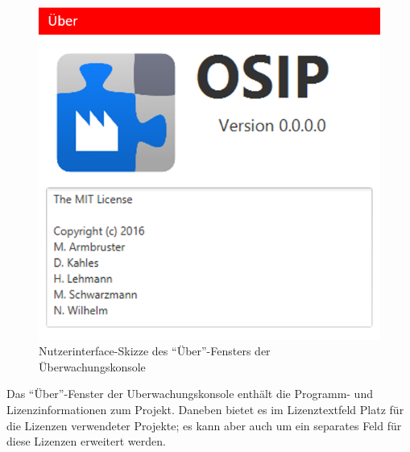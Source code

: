 \documentclass[parskip=full]{scrartcl}
\begin{document}
\begin{figure}[h!]
	\centering
	\includegraphics[scale=0.5]{media/ui-client/ui-uw-uber.png}
	\caption{Nutzerinterface-Skizze des "`Über"'-Fensters der Überwachungskonsole}
\end{figure}
Das "`Über"'-Fenster der \gls{Uberwachungskonsole} enthält die Programm- und Lizenzinformationen zum Projekt. Daneben bietet es im Lizenztextfeld Platz für die Lizenzen verwendeter Projekte; es kann aber auch um ein separates Feld für diese Lizenzen erweitert werden.
\pagebreak

\pagebreak
\printglossaries

{}
\listoffigures
\end{document}
